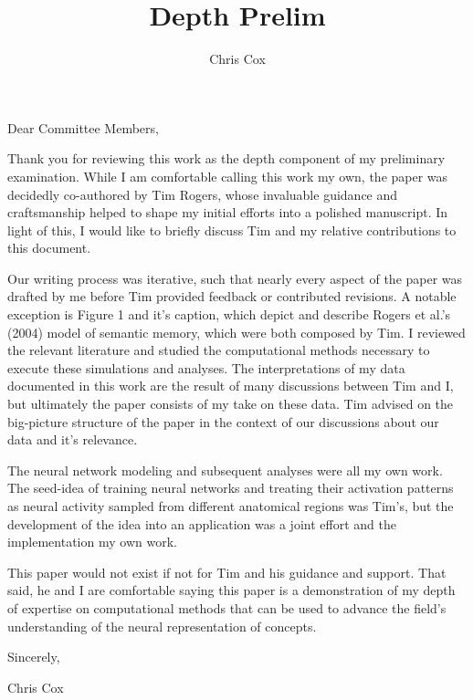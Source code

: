 \documentclass[12pt,letterpaper]{letter}
\author{Chris Cox}
\title{Depth Prelim}
\begin{document}
Dear Committee Members,

Thank you for reviewing this work as the depth component of my preliminary examination. While I am comfortable calling this work my own, the paper was decidedly co-authored by Tim Rogers, whose invaluable guidance and craftsmanship helped to shape my initial efforts into a polished manuscript. In light of this, I would like to briefly discuss Tim and my relative contributions to this document.

Our writing process was iterative, such that nearly every aspect of the paper was drafted by me before Tim provided feedback or contributed revisions. A notable exception is Figure 1 and it's caption, which depict and describe Rogers et al.'s (2004) model of semantic memory, which were both composed by Tim. I reviewed the relevant literature and studied the computational methods necessary to execute these simulations and analyses. The interpretations of my data documented in this work are the result of many discussions between Tim and I, but ultimately the paper consists of my take on these data. Tim advised on the big-picture structure of the paper in the context of our discussions about our data and it's relevance.

The neural network modeling and subsequent analyses were all my own work.  The seed-idea of training neural networks and treating their activation patterns as neural activity sampled from different anatomical regions was Tim's, but the development of the idea into an application was a joint effort and the implementation my own work.

This paper would not exist if not for Tim and his guidance and support. That said, he and I are comfortable saying this paper is a demonstration of my depth of expertise on computational methods that can be used to advance the field's understanding of the neural representation of concepts. 

Sincerely,

Chris Cox
\end{document}
